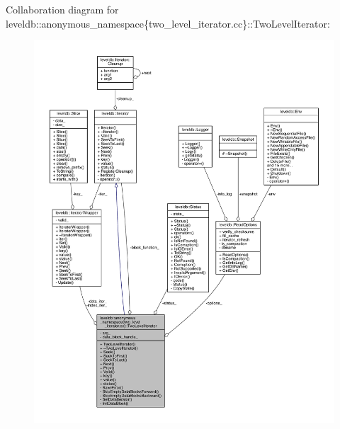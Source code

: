 Collaboration diagram for leveldb\+:\+:anonymous\+\_\+namespace\{two\+\_\+level\+\_\+iterator.\+cc\}\+:\+:Two\+Level\+Iterator\+:
\nopagebreak
\begin{figure}[H]
\begin{center}
\leavevmode
\includegraphics[width=350pt]{classleveldb_1_1anonymous__namespace_02two__level__iterator_8cc_03_1_1_two_level_iterator__coll__graph}
\end{center}
\end{figure}
